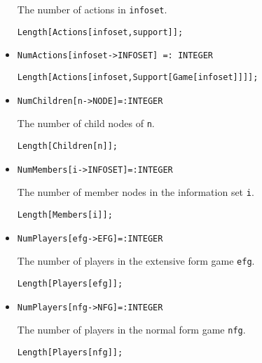 \begin{itemize}
\bd 
The number of actions in \verb+infoset+.
\begin{verbatim}
Length[Actions[infoset,support]]; 
\end{verbatim} 
\ed

\item{}
\protect \large \begin{verbatim}
NumActions[infoset->INFOSET] =: INTEGER
\end{verbatim}\normalsize

\bd \begin{verbatim}
Length[Actions[infoset,Support[Game[infoset]]]]; 
\end{verbatim} 
\ed

\item{}
\protect \large \begin{verbatim}
NumChildren[n->NODE]=:INTEGER
\end{verbatim}\normalsize

\bd 
The number of child nodes of \verb+n+.
\begin{verbatim}
Length[Children[n]];
\end{verbatim} 
\ed

\item{}
\protect \large \begin{verbatim}
NumMembers[i->INFOSET]=:INTEGER
\end{verbatim}\normalsize

\bd 
The number of member nodes in the information set \verb+i+.
\begin{verbatim}
Length[Members[i]];
\end{verbatim} 
\ed

\item{}
\protect \large \begin{verbatim}
NumPlayers[efg->EFG]=:INTEGER
\end{verbatim}\normalsize

\bd 
The number of players in the extensive form game \verb+efg+.
\begin{verbatim}
Length[Players[efg]];
\end{verbatim} 
\ed

\item{}
\protect \large \begin{verbatim}
NumPlayers[nfg->NFG]=:INTEGER
\end{verbatim}\normalsize

\bd 
The number of players in the normal form game \verb+nfg+.
\begin{verbatim}
Length[Players[nfg]];
\end{verbatim} 
\ed


\end{itemize}
